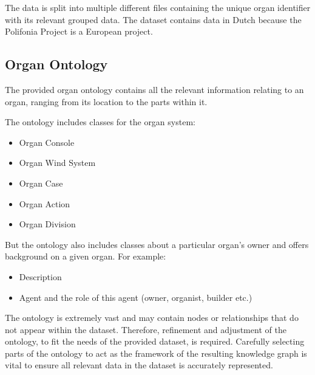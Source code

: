 The data is split into multiple different files containing the unique organ identifier with its relevant grouped data. The dataset contains data in Dutch because the Polifonia Project is a European project.

\subsection{Organ Ontology}
\hspace{0.5cm} The provided organ ontology \cite{organontology} contains all the relevant information relating to an organ, ranging from its location to the parts within it. 

The ontology includes classes for the organ system:

\vspace{-0.15cm}
\begin{itemize}
    \itemsep0em 
\item Organ Console
\vspace{-0.1cm}
\item Organ Wind System
\vspace{-0.1cm}
\item Organ Case
\vspace{-0.1cm}
\item Organ Action
\vspace{-0.1cm}
\item Organ Division
\end{itemize}
\vspace{-0.15cm}

\noindent  But the ontology also includes classes about a particular organ's owner and offers background on a given organ. For example:

\vspace{-0.15cm}
\begin{itemize}
    \itemsep0em 
\item Description
\vspace{-0.1cm}
\item Agent and the role of this agent (owner, organist, builder etc.)
\end{itemize}
\vspace{-0.15cm}

The ontology is extremely vast and may contain nodes or relationships that do not appear within the dataset. Therefore, refinement and adjustment of the ontology, to fit the needs of the provided dataset, is required. Carefully selecting parts of the ontology to act as the framework of the resulting knowledge graph is vital to ensure all relevant data in the dataset is accurately represented. 

